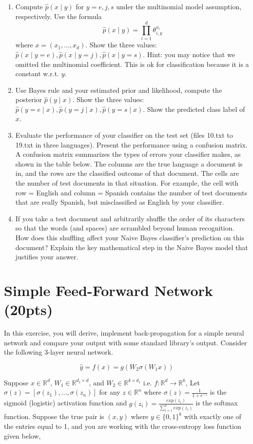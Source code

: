 \documentclass[a4paper]{article}
\theoremstyle{definition}
\begin{document}
\begin{enumerate}
\item
Compute $\hat p(x \mid y)$ for $y=e, j, s$ under the multinomial model assumption, respectively.
Use the formula
$$\hat p(x \mid y) = \prod_{i=1}^d \theta_{i, y}^{x_i}$$
where $x=(x_1, \ldots, x_d)$.
Show the three values: $\hat p(x \mid y=e), \hat p(x \mid y=j), \hat p(x \mid y=s)$.
Hint: you may notice that we omitted the multinomial coefficient.  This is ok for classification because it is a constant w.r.t. $y$.


\item
Use Bayes rule and your estimated prior and likelihood, compute the posterior $\hat p(y \mid x)$.
Show the three values: $\hat p(y=e \mid x), \hat p(y=j \mid x), \hat p(y=s \mid x)$.
Show the predicted class label of $x$.


\item
Evaluate the performance of your classifier on the test set (files 10.txt to 19.txt in three languages).
Present the performance using a confusion matrix. A confusion matrix summarizes the types of errors your classifier makes, as shown in the table below.   The columns are the true language a document is in, and the rows are the classified outcome of that document.  The cells are the number of test documents in that situation.  For example, the cell with row = English and column = Spanish contains the number of test documents that are really Spanish, but misclassified as English by your classifier.

\item If you take a test document and arbitrarily shuffle the order of its characters so that the words (and spaces) are scrambled beyond human recognition.  How does this shuffling affect your Naive Bayes classifier's prediction on this document?  Explain the key mathematical step in the Naive Bayes model that justifies your answer.

\end{enumerate}

\section{Simple Feed-Forward Network (20pts)}
In this exercise, you will derive, implement back-propagation for a simple neural network and compare your output with some standard library’s output. Consider the following 3-layer neural network.

\[
\hat{y} = f(x) = g(W_2\sigma(W_1x))
\]

Suppose $x \in \mathbb{R}^d$, $W_1 \in \mathbb{R}^{d_1 \times d}$, and $W_2 \in \mathbb{R}^{k \times d_1}$ i.e. $f: \mathbb{R}^d \rightarrow \mathbb{R}^k$, Let $\sigma(z) = [\sigma(z_1), ..., \sigma(z_n)]$ for any $z \in \mathbb{R}^n$ where $\sigma(z) = \frac{1}{1 + e^{-z}}$ is the sigmoid (logistic) activation function and $g(z_i) = \frac{exp(z_i)}{\sum_{i=1}^k exp(z_i)}$ is the softmax function. Suppose the true pair is $(x, y)$ where $y \in \{0, 1\}^k$ with exactly one of the entries equal to 1, and you are working with the cross-entropy loss function given below,
\end{document}
